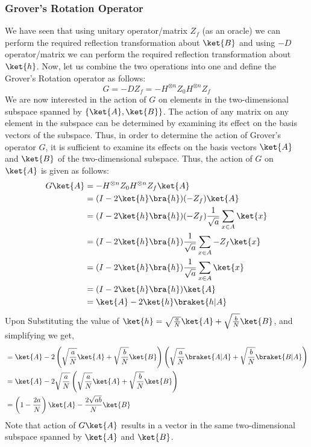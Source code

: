 \documentclass[12pt, oneside]{book}
\theoremstyle{definition}
\theoremstyle{definition}
\theoremstyle{remark}
\begin{document}
\subsubsection{Grover's Rotation Operator}
We have seen that using unitary operator/matrix $Z_f$ (as an oracle) we can perform the required reflection transformation about $\ket{B}$ and using $-D$ operator/matrix we can perform the required reflection transformation about $\ket{h}$. Now, let us combine the two operations into one and define the Grover's Rotation operator as follows:
\[
G=-DZ_f=-H^{\otimes n}Z_0H^{\otimes n}Z_f
\]
We are now interested in the action of $G$ on elements in the two-dimensional subspace spanned by $\{\ket{A},\ket{B}\}$. The action of any matrix on any element in the subspace can be determined by examining its effect on the basis vectors of the subspace. Thus, in order to determine the action of Grover's operator $G$, it is sufficient to examine its effects on the basis vectors $\ket{A}$ and $\ket{B}$ of the two-dimensional subspace. Thus, the action of $G$ on $\ket{A}$ is given as follows:
\begin{align*}
    G\ket{A}&=-H^{\otimes n}Z_0H^{\otimes n}Z_f\ket{A} \\
    &=(I-2\ket{h}\bra{h})(-Z_f)\ket{A}\\
    &=(I-2\ket{h}\bra{h})(-Z_f)\frac{1}{\sqrt{a}}\sum_{x \in A}\ket{x}\\
    &=(I-2\ket{h}\bra{h})\frac{1}{\sqrt{a}}\sum_{x \in A}-Z_f\ket{x}\\
    &=(I-2\ket{h}\bra{h})\frac{1}{\sqrt{a}}\sum_{x \in A}\ket{x}\\
    &=(I-2\ket{h}\bra{h})\ket{A}\\
    &=\ket{A}-2\ket{h}\braket{h|A}\\
\end{align*}
Upon Substituting the value of $\ket{h}=\sqrt{\frac{a} {N}}\ket{A}+\sqrt{\frac{b}{N}}\ket{B}$, and simplifying we get,
\begin{align*}
    &=\ket{A}-2\left(\sqrt{\frac{a} {N}}\ket{A}+\sqrt{\frac{b}{N}}\ket{B}\right)\left(\sqrt{\frac{a} {N}}\braket{A|A}+\sqrt{\frac{b}{N}}\braket{B|A}\right)\\
    &=\ket{A}-2\sqrt{\frac{a}{N}}\left(\sqrt{\frac{a} {N}}\ket{A}+\sqrt{\frac{b}{N}}\ket{B}\right)\\
    &=\left(1-\frac{2a}{N}\right)\ket{A}-\frac{2\sqrt{ab}}{N}\ket{B}\\
\end{align*}
Note that action of $G\ket{A}$ results in a vector in the same two-dimensional subspace spanned by $\ket{A}$ and $\ket{B}$.
\end{document}
